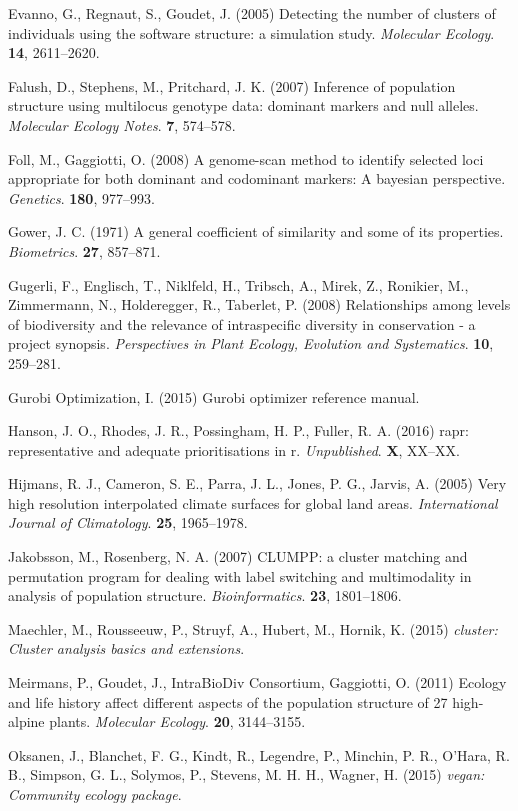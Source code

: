 \documentclass[11pt,]{article}
\begin{document}
Evanno, G., Regnaut, S., Goudet, J. (2005) Detecting the number of
clusters of individuals using the software structure: a simulation
study. \emph{Molecular Ecology}. \textbf{14}, 2611--2620.

Falush, D., Stephens, M., Pritchard, J. K. (2007) Inference of
population structure using multilocus genotype data: dominant markers
and null alleles. \emph{Molecular Ecology Notes}. \textbf{7}, 574--578.

Foll, M., Gaggiotti, O. (2008) A genome-scan method to identify selected
loci appropriate for both dominant and codominant markers: A bayesian
perspective. \emph{Genetics}. \textbf{180}, 977--993.

Gower, J. C. (1971) A general coefficient of similarity and some of its
properties. \emph{Biometrics}. \textbf{27}, 857--871.

Gugerli, F., Englisch, T., Niklfeld, H., Tribsch, A., Mirek, Z.,
Ronikier, M., Zimmermann, N., Holderegger, R., Taberlet, P. (2008)
Relationships among levels of biodiversity and the relevance of
intraspecific diversity in conservation - a project synopsis.
\emph{Perspectives in Plant Ecology, Evolution and Systematics}.
\textbf{10}, 259--281.

Gurobi Optimization, I. (2015) Gurobi optimizer reference manual.

Hanson, J. O., Rhodes, J. R., Possingham, H. P., Fuller, R. A. (2016)
rapr: representative and adequate prioritisations in r.
\emph{Unpublished}. \textbf{X}, XX--XX.

Hijmans, R. J., Cameron, S. E., Parra, J. L., Jones, P. G., Jarvis, A.
(2005) Very high resolution interpolated climate surfaces for global
land areas. \emph{International Journal of Climatology}. \textbf{25},
1965--1978.

Jakobsson, M., Rosenberg, N. A. (2007) CLUMPP: a cluster matching and
permutation program for dealing with label switching and multimodality
in analysis of population structure. \emph{Bioinformatics}. \textbf{23},
1801--1806.

Maechler, M., Rousseeuw, P., Struyf, A., Hubert, M., Hornik, K. (2015)
\emph{cluster: Cluster analysis basics and extensions}.

Meirmans, P., Goudet, J., IntraBioDiv Consortium, Gaggiotti, O. (2011)
Ecology and life history affect different aspects of the population
structure of 27 high-alpine plants. \emph{Molecular Ecology}.
\textbf{20}, 3144--3155.

Oksanen, J., Blanchet, F. G., Kindt, R., Legendre, P., Minchin, P. R.,
O'Hara, R. B., Simpson, G. L., Solymos, P., Stevens, M. H. H., Wagner,
H. (2015) \emph{vegan: Community ecology package}.
\end{document}
